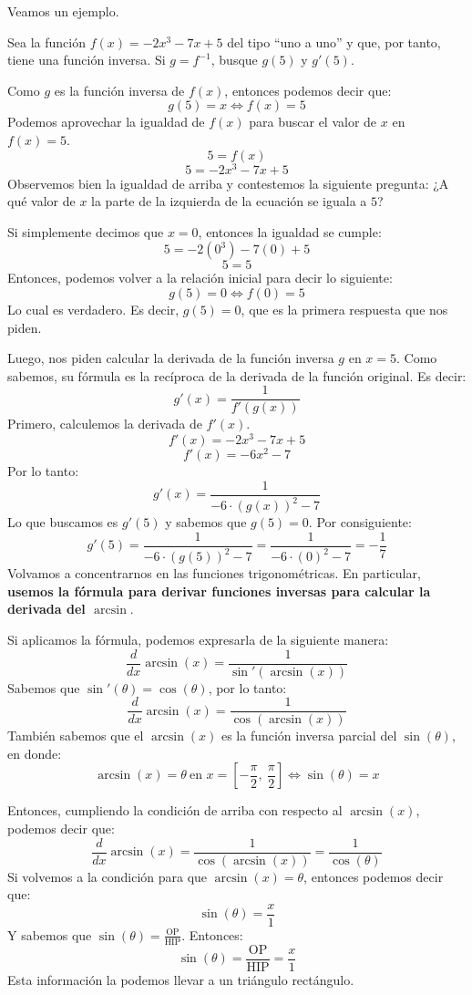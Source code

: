\documentclass[12pt]{article}
\begin{document}
Veamos un ejemplo.

Sea la función $f(x) = -2x^{3} - 7x + 5$ del tipo ``uno a uno'' y que, por tanto, tiene una función inversa. Si $g = f^{-1}$, busque $g(5)$ y $g'(5)$.

Como $g$ es la función inversa de $f(x)$, entonces podemos decir que:
\[g(5) = x \iff f(x) = 5\]
Podemos aprovechar la igualdad de $f(x)$ para buscar el valor de $x$ en $f(x) = 5$.
\[5 = f(x)\]
\[5 = -2x^{3} - 7x + 5\]
Observemos bien la igualdad de arriba y contestemos la siguiente pregunta: ¿A qué valor de $x$ la parte de la izquierda de la ecuación se iguala a $5$?

Si simplemente decimos que $x = 0$, entonces la igualdad se cumple:
\[5 = -2(0^{3}) - 7(0) + 5\]
\[5 = 5\]
Entonces, podemos volver a la relación inicial para decir lo siguiente:
\[g(5) = 0 \iff f(0) = 5\]
Lo cual es verdadero. Es decir, $g(5) = 0$, que es la primera respuesta que nos piden.

Luego, nos piden calcular la derivada de la función inversa $g$ en $x = 5$. Como sabemos, su fórmula es la recíproca de la derivada de la función original. Es decir:
\[g'(x) = \frac{1}{f'(g(x))}\]
Primero, calculemos la derivada de $f'(x)$.
\[f'(x) = -2x^{3} - 7x + 5\]
\[f'(x) = -6x^{2} - 7\]
Por lo tanto:
\[g'(x) = \frac{1}{-6 \cdot (g(x))^{2} - 7}\]
Lo que buscamos es $g'(5)$ y sabemos que $g(5) = 0$. Por consiguiente:
\[g'(5) = \frac{1}{-6 \cdot (g(5))^{2} - 7} = \frac{1}{-6 \cdot (0)^{2} - 7} = - \frac{1}{7}\]
Volvamos a concentrarnos en las funciones trigonométricas. En particular, \textbf{usemos la fórmula para derivar funciones inversas para calcular la derivada del $\arcsin$}.

Si aplicamos la fórmula, podemos expresarla de la siguiente manera:
\[\frac{d}{dx} \arcsin(x) = \frac{1}{\sin'(\arcsin(x))}\]
Sabemos que $\sin'(\theta) = \cos(\theta)$, por lo tanto:
\[\frac{d}{dx} \arcsin(x) = \frac{1}{\cos(\arcsin(x))}\]
También sabemos que el $\arcsin(x)$ es la función inversa parcial del $\sin(\theta)$, en donde:
\[\arcsin(x) = \theta \ \text{en } x = \left[- \frac{\pi}{2}, \ \frac{\pi}{2}\right] \iff \sin(\theta) = x\]

Entonces, cumpliendo la condición de arriba con respecto al $\arcsin(x)$, podemos decir que:
\[\frac{d}{dx} \arcsin(x) = \frac{1}{\cos(\arcsin(x))} = \frac{1}{\cos(\theta)}\]
Si volvemos a la condición para que $\arcsin(x) = \theta$, entonces podemos decir que:
\[\sin(\theta) = \frac{x}{1}\]
Y sabemos que $\sin(\theta) = \frac{\text{OP}}{\text{HIP}}$. Entonces:
\[\sin(\theta) = \frac{\text{OP}}{\text{HIP}} = \frac{x}{1}\]
Esta información la podemos llevar a un triángulo rectángulo.
\end{document}
